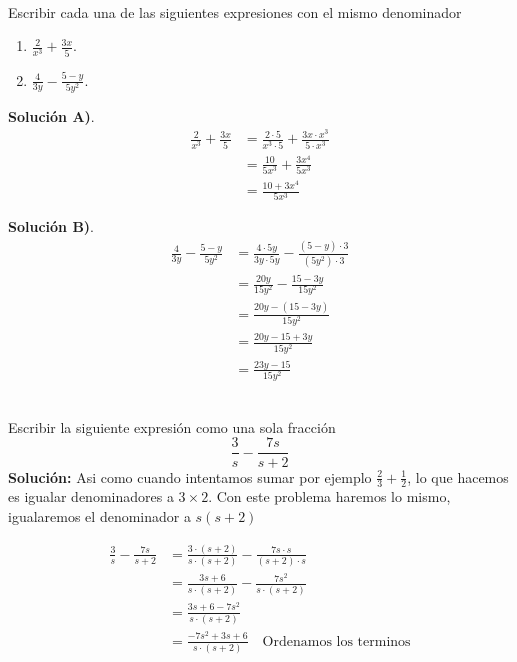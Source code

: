 \begin{ejemplo}{\ \\}
	Escribir cada una de las siguientes expresiones con el mismo denominador
	\begin{enumerate}[label=\Alph*)]
		\item $\frac{2}{x^3} + \frac{3x}{5}$.
		\item $\frac{4}{3y} - \frac{5-y}{5y^2}$.		
	\end{enumerate}
	\textbf{Solución A)}. 
	\begin{align*}
	\frac{2}{x^3} + \frac{3x}{5} &= \frac{2 \cdot 5}{x^3 \cdot 5} + \frac{3x \cdot x^3}{5\cdot x^3}\\
	&= \frac{10}{5x^3} + \frac{3x^4}{5x^3} \\
	&= \frac{10+3x^4}{5x^3}
	\end{align*}
	
	\textbf{Solución B)}. 
	\begin{align*}
	\frac{4}{3y} - \frac{5-y}{5y^2} &= \frac{4\cdot 5y}{3y\cdot 5y} - \frac{(5-y)\cdot 3}{(5y^2)\cdot 3}\\
	&= \frac{20y}{15y^2} - \frac{15-3y}{15y^2} \\
	&= \frac{20y-(15-3y)}{15y^2} \\
	&= \frac{20y-15+3y}{15y^2} \\
	&= \frac{23y-15}{15y^2}
	\end{align*}
	
\end{ejemplo}



\begin{ejemplo}{\ \\}
	Escribir la siguiente expresión como una sola fracción
	\[\frac{3}{s} - \frac{7s}{s+2}\]
	\textbf{Solución: }Asi como cuando intentamos sumar por ejemplo $\frac{2}{3} + \frac{1}{2}$, lo que hacemos es igualar denominadores a $3\times 2$. Con este problema haremos lo mismo, igualaremos el denominador a $s(s+2)$
	
	\begin{align*}
	\frac{3}{s} - \frac{7s}{s+2} &= \frac{3\cdot (s+2)}{s\cdot (s+2)} - \frac{7s\cdot s}{(s+2)\cdot s}\\
	&= \frac{3s+6}{s\cdot (s+2)} - \frac{7s^2}{s\cdot (s+2)} \\
	&= \frac{3s+6-7s^2}{s\cdot (s+2) } \\
	&= \frac{-7s^2+3s+6}{s\cdot (s+2)} \quad \text{Ordenamos los terminos}	
	\end{align*}
	
\end{ejemplo}



